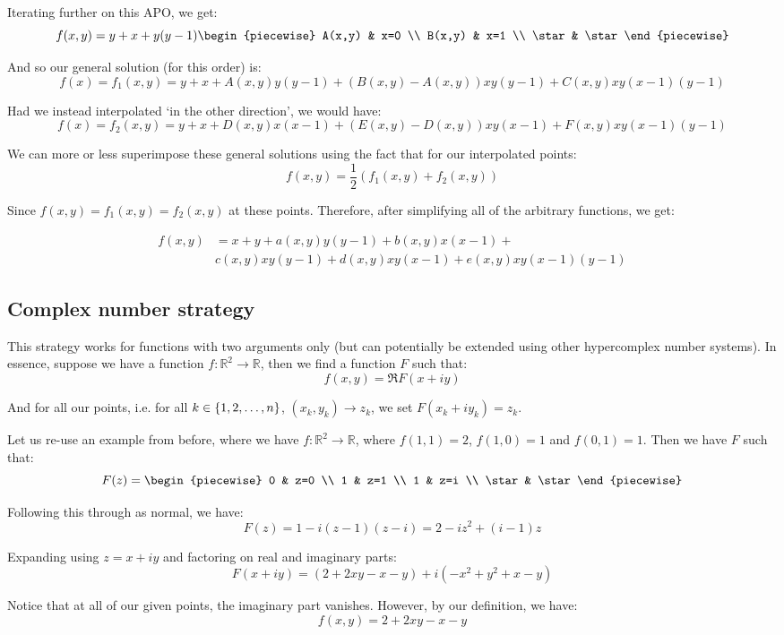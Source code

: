 \begin{example}
    Iterating further on this APO, we get:
    $$
        f(x,y)=y+x+y(y-1)\begin{piecewise}
            A(x,y) & x=0 \\
            B(x,y) & x=1 \\
            \star & \star
        \end{piecewise}
    $$

    And so our general solution (for this order) is:
    $$
        f(x)=f_1(x,y)=y+x+A(x,y)y(y-1)+(B(x,y)-A(x,y))xy(y-1)+C(x,y)xy(x-1)(y-1)
    $$

    Had we instead interpolated `in the other direction', we would have:
    $$
        f(x)=f_2(x,y)=y+x+D(x,y)x(x-1)+(E(x,y)-D(x,y))xy(x-1)+F(x,y)xy(x-1)(y-1)
    $$

    We can more or less superimpose these general solutions using the fact that for our interpolated points:
    $$
        f(x,y)=\frac{1}{2}(f_1(x,y)+f_2(x,y))
    $$

    Since $f(x,y)=f_1(x,y)=f_2(x,y)$ at these points. Therefore, after simplifying all of the arbitrary functions, we get:

    \begin{align*}
        f(x,y) &= x+y+a(x,y)y(y-1)+b(x,y)x(x-1)+ \\
        & c(x,y)xy(y-1)+d(x,y)xy(x-1)+e(x,y)xy(x-1)(y-1)
    \end{align*}
\end{example}

\subsection{Complex number strategy}
This strategy works for functions with two arguments only (but can potentially be extended using other hypercomplex number systems). In essence, suppose we have a function $f:\mathbb{R}^2\to\mathbb{R}$, then we find a function $F$ such that:
$$
    f(x,y)=\Re{F(x+iy)}
$$

And for all our points, i.e. for all $k\in\{1,2,\dots,n\}$, $(x_k,y_k)\to z_k$, we set $F(x_k+iy_k)=z_k$.

\begin{example}
    Let us re-use an example from before, where we have $f:\mathbb{R}^2\to\mathbb{R}$, where $f(1,1)=2$, $f(1,0)=1$ and $f(0,1)=1$. Then we have $F$ such that:
    $$
        F(z) = \begin{piecewise}
            0 & z=0 \\
            1 & z=1 \\
            1 & z=i \\
            \star & \star
        \end{piecewise}
    $$

    Following this through as normal, we have:
    $$
        F(z)=1-i(z-1)(z-i)=2-iz^2+(i-1)z
    $$

    Expanding using $z=x+iy$ and factoring on real and imaginary parts:
    $$
        F(x+iy) = (2+2xy-x-y)+i(-x^2+y^2+x-y)
    $$

    Notice that at all of our given points, the imaginary part vanishes. However, by our definition, we have:
    $$
        f(x,y)=2+2xy-x-y
    $$
\end{example}


